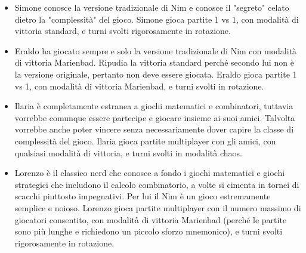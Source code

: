 \begin{itemize}
\item
	Simone conosce la versione tradizionale di Nim e conosce il "segreto" celato dietro la "complessità" del gioco.
	\newline
	Simone gioca partite 1 vs 1, con modalità di vittoria standard, e turni svolti rigorosamente in rotazione.
\item
	Eraldo ha giocato sempre e solo la versione tradizionale di Nim con modalità di vittoria Marienbad. Ripudia la vittoria standard perché secondo lui non è la versione originale, pertanto non deve essere giocata.
	\newline
	Eraldo gioca partite 1 vs 1, con modalità di vittoria Marienbad, e turni svolti in rotazione.
\item
	Ilaria è completamente estranea a giochi matematici e combinatori, tuttavia vorrebbe comunque essere partecipe e giocare insieme ai suoi amici. Talvolta vorrebbe anche poter vincere senza necessariamente dover capire la classe di complessità del gioco.
	\newline
	Ilaria gioca partite multiplayer con gli amici, con qualsiasi modalità di vittoria, e turni svolti in modalità chaos.
\item
	Lorenzo è il classico nerd che conosce a fondo i giochi matematici e giochi strategici che includono il calcolo combinatorio, a volte si cimenta in tornei di scacchi piuttosto impegnativi. Per lui il Nim è un gioco estremamente semplice e noioso.
	\newline
	Lorenzo gioca partite multiplayer con il numero massimo di giocatori consentito, con modalità di vittoria Marienbad (perché le partite sono più lunghe e richiedono un piccolo sforzo mnemonico), e turni svolti rigorosamente in rotazione.
\end{itemize}

\newpage
